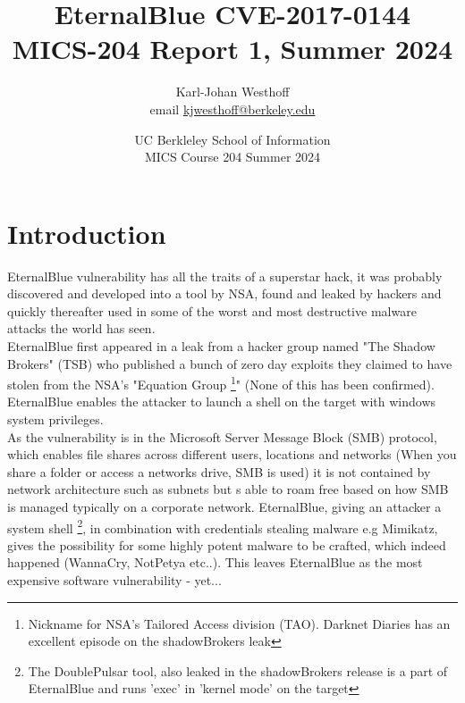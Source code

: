 \documentclass[
	letterpaper, %
	10pt, %
	unnumberedsections, %
	twoside, %
]{LTJournalArticle}
\title{EternalBlue CVE-2017-0144 \\ MICS-204 Report 1, Summer 2024} %
\author{
	Karl-Johan Westhoff \\
	email \href{mailto:kjwesthoff@berkeley.edu}{kjwesthoff@berkeley.edu}
}
\date{UC Berkleley School of Information \\
MICS Course 204 Summer 2024
}
\begin{document}
\maketitle %


\section{Introduction}
EternalBlue \cite[CVE-2017-0144]{CVE-2017-0144} vulnerability has all the traits of a superstar hack, it was probably discovered and developed into a tool by NSA, found and leaked by hackers and quickly thereafter used in some of the worst and most destructive malware attacks the world has seen. \\
\newline
EternalBlue first appeared in a leak\cite{Rapid7-on-S0hadow-Broker-Leak} from a hacker group named "The Shadow Brokers"\cite{shadowBrokers-wiki} (TSB) who published a bunch of zero day exploits they claimed to have stolen from the NSA's "Equation Group \footnote{Nickname for NSA’s Tailored Access division (TAO). Darknet Diaries \cite{Darknet-Diaries-ep53} has an excellent episode on the shadowBrokers leak}"\cite{kaspersky-eq-group} (None of this has been confirmed). \\
\newline
EternalBlue enables the attacker to launch a shell on the target with windows system privileges. \\
\newline
As the vulnerability is in the Microsoft Server Message Block (SMB) protocol, which enables file shares across different users, locations and networks (When you share a folder or access a networks drive, SMB is used) it is not contained by network architecture such as subnets but s able to roam free based on how SMB is managed typically on a corporate network. EternalBlue, giving an attacker a system shell \footnote{The DoublePulsar tool, also leaked in the shadowBrokers release is a part of EternalBlue and runs 'exec' in 'kernel mode' on the target}, in combination with credentials stealing malware e.g Mimikatz, gives the possibility for some highly potent malware to be crafted, which indeed happened (WannaCry, NotPetya etc..). This leaves EternalBlue as the most expensive software vulnerability - yet...  
\end{document}
